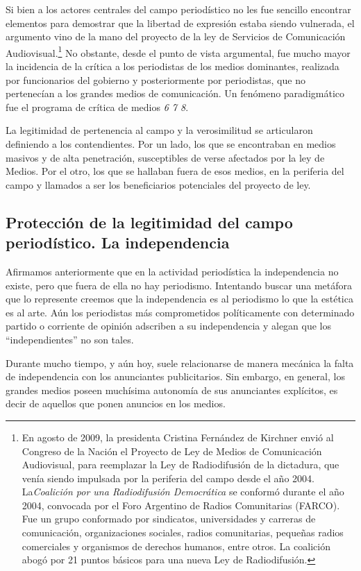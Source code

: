 Si bien a los actores centrales del campo periodístico no les fue sencillo encontrar elementos para demostrar que la libertad de expresión estaba siendo vulnerada, el argumento vino de la mano del proyecto de la ley de Servicios de Comunicación Audiovisual.\footnote{En agosto de 2009, la presidenta Cristina Fernández de Kirchner envió al Congreso de la Nación el Proyecto de Ley de Medios de Comunicación Audiovisual, para reemplazar la Ley de Radiodifusión de la dictadura, que venía siendo impulsada por la periferia del campo desde el año 2004. La\emph{Coalición por una Radiodifusión Democrática} se conformó durante el año 2004, convocada por el Foro Argentino de Radios Comunitarias (FARCO). Fue un grupo conformado por sindicatos, universidades y carreras de comunicación, organizaciones sociales, radios comunitarias, pequeñas radios comerciales y organismos de derechos humanos, entre otros. La coalición abogó por 21 puntos básicos para una nueva Ley de Radiodifusión.} No obstante, desde el punto de vista argumental, fue mucho mayor la incidencia de la crítica a los periodistas de los medios dominantes, realizada por funcionarios del gobierno y posteriormente por periodistas, que no pertenecían a los grandes medios de comunicación. Un fenómeno paradigmático fue el programa de crítica de medios \emph{6 7 8}.

La legitimidad de pertenencia al campo y la verosimilitud se articularon definiendo a los contendientes. Por un lado, los que se encontraban en medios masivos y de alta penetración, susceptibles de verse afectados por la ley de Medios. Por el otro, los que se hallaban fuera de esos medios, en la periferia del campo y llamados a ser los beneficiarios potenciales del proyecto de ley.


\subsection{Protección de la legitimidad del campo periodístico. La independencia}

Afirmamos anteriormente que en la actividad periodística la independencia no existe, pero que fuera de ella no hay periodismo. Intentando buscar una metáfora que lo represente creemos que la independencia es al periodismo lo que la estética es al arte. Aún los periodistas más comprometidos políticamente con determinado partido o corriente de opinión adscriben a su independencia y alegan que los ``independientes'' no son tales.

Durante mucho tiempo, y aún hoy, suele relacionarse de manera mecánica la falta de independencia con los anunciantes publicitarios. Sin embargo, en general, los grandes medios poseen muchísima autonomía de sus anunciantes explícitos, es decir de aquellos que ponen anuncios en los medios.

